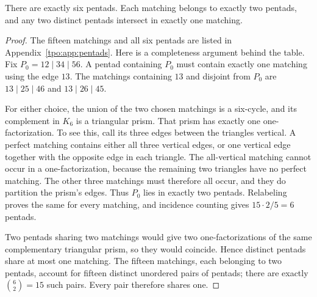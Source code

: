 \documentclass[11pt,letterpaper]{article}
\numberwithin{equation}{section}
\theoremstyle{definition}
\theoremstyle{remark}
\begin{document}
\begin{lemma}
\label{tpo:lem:pentads}
There are exactly six pentads. Each matching belongs to exactly two pentads,
and any two distinct pentads intersect in exactly one matching.
\end{lemma}
\begin{proof}
The fifteen matchings and all six pentads are listed in
Appendix~\ref{tpo:app:pentads}. Here is a completeness argument behind the table.
Fix $P_0=12\mid34\mid56$. A pentad containing $P_0$ must contain exactly one
matching using the edge $13$. The matchings containing $13$ and disjoint
from $P_0$ are $13\mid25\mid46$ and $13\mid26\mid45$.

For either choice, the union of the two chosen matchings is a six-cycle, and
its complement in $K_6$ is a triangular prism. That prism has exactly one
one-factorization. To see this, call its three edges between the triangles
vertical. A perfect matching contains either all three vertical edges, or
one vertical edge together with the opposite edge in each triangle. The
all-vertical matching cannot occur in a one-factorization, because the
remaining two triangles have no perfect matching. The other three matchings
must therefore all occur, and they do partition the prism's edges.
Thus $P_0$ lies in exactly two pentads. Relabeling proves the same for every
matching, and incidence counting gives $15\cdot2/5=6$ pentads.

Two pentads sharing two matchings would give two one-factorizations of the
same complementary triangular prism, so they would coincide. Hence distinct
pentads share at most one matching. The fifteen matchings, each belonging to
two pentads, account for fifteen distinct unordered pairs of pentads; there
are exactly $\binom62=15$ such pairs. Every pair therefore shares one.
\end{proof}
\end{document}
